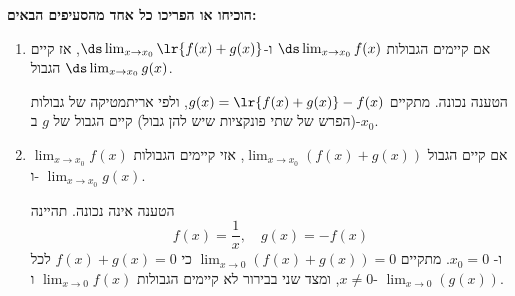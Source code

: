\textbf{הוכיחו או הפריכו כל אחד מהסעיפים הבאים:}
\begin{enumerate}
\item אם קיימים הגבולות $\ds\lim_{x\to x_0}f(x)$ ו-$\ds\lim_{x\to x_0}\lr{f(x)+g(x)}$, אז קיים הגבול $\ds\lim_{x\to x_0}g(x)$.
\ifsol
{}
\begin{solbox}
הטענה נכונה. מתקיים $g(x)=\lr{f(x)+g(x)}-f(x)$, ולפי אריתמטיקה של גבולות (הפרש של שתי פונקציות שיש להן גבול) קיים הגבול של $g$ ב-$x_0$.
\end{solbox}
\fi

    \item
    אם
     קיים הגבול
    $\displaystyle\lim_{x\to x_0}\left(f(x)+g(x)\right)$,
    אזי קיימים הגבולות
    $\displaystyle\lim_{x\to x_0} f(x)$
    ו-
    $\displaystyle\lim_{x\to x_0} g(x)$.
\ifsol
{}
\begin{solbox}
הטענה אינה נכונה.
תהיינה
$$f(x)=\frac{1}{x},\quad
g(x)=-f(x)$$
ו-
$x_0=0$.
מתקיים
$\displaystyle\lim_{x\to0}(f(x)+g(x))=0$
כי
$f(x)+g(x)=0$
לכל
$x\neq0$, ומצד שני
בבירור לא קיימים הגבולות
$\displaystyle\lim_{x\to0}f(x)$
ו-
$\displaystyle\lim_{x\to0}(g(x))$.


\end{solbox}
\end{enumerate}
